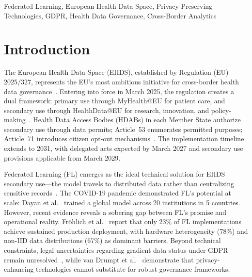 \documentclass[conference,a4paper]{IEEEtran}
\begin{document}
\begin{IEEEkeywords}
Federated Learning, European Health Data Space, Privacy-Preserving Technologies, GDPR, Health Data Governance, Cross-Border Analytics
\end{IEEEkeywords}

\section{Introduction}
\label{sec:introduction}

The European Health Data Space (EHDS), established by Regulation (EU) 2025/327, represents the EU's most ambitious initiative for cross-border health data governance~\cite{eu2025ehds}. Entering into force in March 2025, the regulation creates a dual framework: primary use through MyHealth@EU for patient care, and secondary use through HealthData@EU for research, innovation, and policy-making~\cite{ganna2024boost}. Health Data Access Bodies (HDABs) in each Member State authorize secondary use through data permits; Article~53 enumerates permitted purposes; Article~71 introduces citizen opt-out mechanisms~\cite{staunton2024ethical}. The implementation timeline extends to 2031, with delegated acts expected by March 2027 and secondary use provisions applicable from March 2029.

Federated Learning (FL) emerges as the ideal technical solution for EHDS secondary use---the model travels to distributed data rather than centralizing sensitive records~\cite{mcmahan2017communication, kairouz2021advances, rieke2020future}. The COVID-19 pandemic demonstrated FL's potential at scale: Dayan et al.~\cite{dayan2021federated} trained a global model across 20 institutions in 5 countries. However, recent evidence reveals a sobering gap between FL's promise and operational reality. Fr\"ohlich et al.~\cite{frohlich2025reality} report that only 23\% of FL implementations achieve sustained production deployment, with hardware heterogeneity (78\%) and non-IID data distributions (67\%) as dominant barriers. Beyond technical constraints, legal uncertainties regarding gradient data status under GDPR remain unresolved~\cite{quinn2024gdpr}, while van Drumpt et al.~\cite{vandrumpt2025pets} demonstrate that privacy-enhancing technologies cannot substitute for robust governance frameworks.
\end{document}
